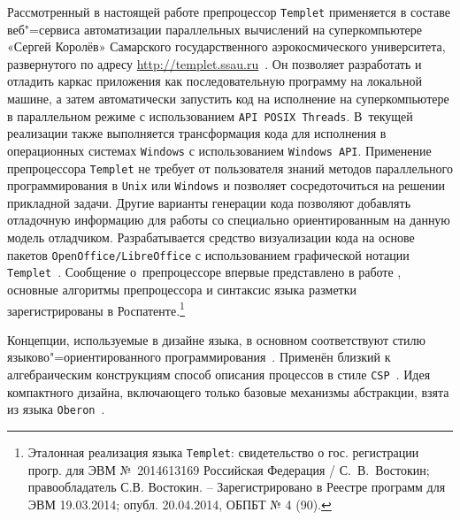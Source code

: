 Рассмотренный в настоящей работе препроцессор {\tt Templet} применяется в составе веб"=сервиса автоматизации параллельных вычислений на суперкомпьютере «Сергей Королёв» Самарского государственного аэрокосмического университета, развернутого по адресу \url{http://templet.ssau.ru}~\cite{vostokin:bib1:r}. 
Он позволяет разработать и отладить каркас приложения как последовательную программу на локальной машине, а затем автоматически запустить код на исполнение на суперкомпьютере в параллельном режиме с использованием {\tt API POSIX Threads}. 
В~текущей реализации также выполняется  трансформация кода для исполнения в операционных системах {\tt Windows} с использованием {\tt Windows API}. 
Применение препроцессора {\tt Templet} не требует от пользователя знаний методов параллельного программирования в {\tt Unix} или {\tt Windows} и позволяет сосредоточиться на решении прикладной задачи. 
Другие варианты генерации кода позволяют добавлять отладочную информацию для работы со специально ориентированным на данную модель отладчиком. 
Разрабатывается средство визуализации кода на основе пакетов {\tt Open\-Office/LibreOffice} с использованием графической нотации {\tt Templet}~\cite{vostokin:bib2:r}. 
Сообщение о~препроцессоре впервые представлено в работе \cite{vostokin:bib3:r}, основные алгоритмы препроцессора и синтаксис языка разметки зарегистрированы в Рос\-па\-тенте.\footnote{Эталонная реализация языка {\tt Templet}: свидетельство о гос. регистрации прогр. для ЭВМ №~2014613169 Российская Федерация / С.~В.~Востокин; правообладатель С.В. Востокин. – Зарегистрировано в Реестре программ для ЭВМ 19.03.2014; опубл. 20.04.2014, ОБПБТ № 4 (90).}


Концепции, используемые в дизайне языка, в основном соответствуют стилю языково"=ориентированного программирования~\cite{vostokin:bib5:r, vostokin:bib6:r}.
Применён близкий к алгебраическим конструкциям способ описания процессов в стиле {\tt CSP}~\cite{vostokin:bib7:r}. 
Идея компактного дизайна, включающего только базовые механизмы абстракции, взята из языка {\tt Oberon}~\cite{vostokin:bib8:r}.

